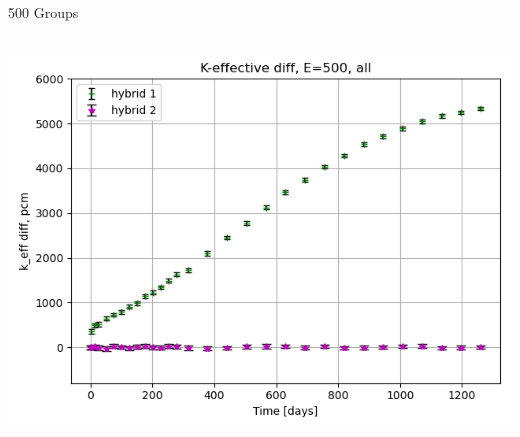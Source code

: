 \documentclass[
	11pt, %
	aspectratio=169, %
]{beamer}
\begin{document}
\begin{frame}{500 Groups}
\begin{columns}[c]
\begin{column}{0.32\textwidth}
			\includegraphics[width=\textwidth]{../figures/keff/keff_all_500_diff.png}
		\end{column}
	\end{columns}
\end{frame}
\end{document}
